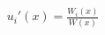 \documentclass[preview]{standalone}
\begin{document}
\begin{align*}
u_i'(x) = \frac{W_i(x)}{W(x)}
\end{align*}
\end{document}
